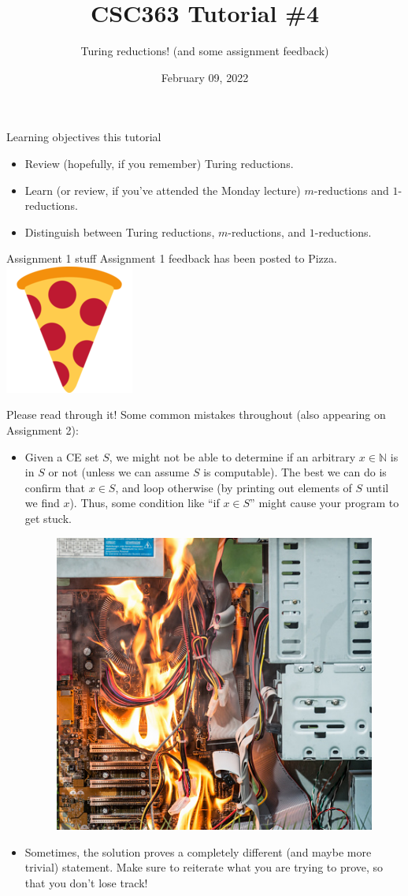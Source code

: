\documentclass{beamer}
\title{CSC363 Tutorial \#4}
\subtitle{Turing reductions! (and some assignment feedback)}
\date{February 09, 2022}
\institute{}
\newcommand{\emojipizza}{\includegraphics{img/pizza.png}}
\newcommand{\N}{\mathbb N}
\begin{document}
\maketitle

\begin{frame}{Learning objectives this tutorial}
\begin{itemize}
\item Review (hopefully, if you remember) Turing reductions.
\item Learn (or review, if you've attended the Monday lecture) $m$-reductions and $1$-reductions.
\item Distinguish between Turing reductions, $m$-reductions, and $1$-reductions.
\end{itemize}
\end{frame}

\begin{frame}{Assignment 1 stuff}
Assignment 1 feedback has been posted to Pizza. \emojipizza

Please read through it! Some common mistakes throughout (also appearing on Assignment 2):

\pause


\begin{itemize}
    \item Given a CE set $S$, we might not be able to determine if an arbitrary $x \in \N$ is in $S$ or not (unless we can assume $S$ is computable). The best we can do is confirm that $x \in S$, and loop otherwise (by printing out elements of $S$ until we find $x$). Thus, some condition like ``if $x \in S$'' might cause your program to get stuck.
    
    \pause
    
    \begin{figure}[h]
        \centering
        \includegraphics[scale=0.8]{img/computer_fire.jpg}
    \end{figure}
    
    \item Sometimes, the solution proves a completely different (and maybe more trivial) statement. Make sure to reiterate what you are trying to prove, so that you don't lose track!
\end{itemize}
\end{frame}
\end{document}

